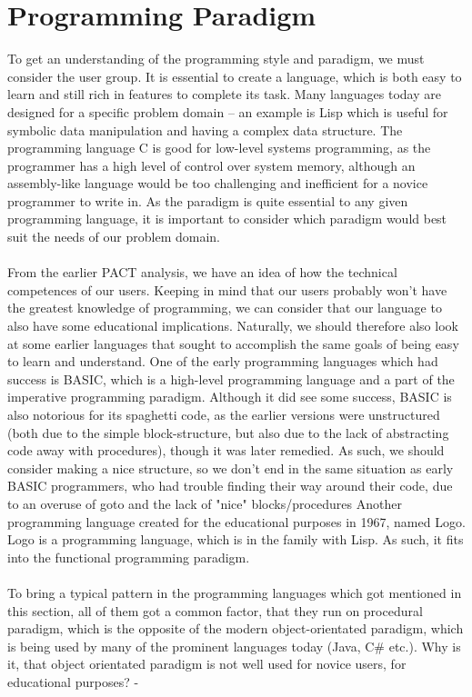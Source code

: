
\section{Programming Paradigm}
\label{programmingparadigm}
To get an understanding of the programming style and paradigm, we must consider the user group. It is essential to create a language, which is both easy to learn and still rich in features to complete its task. Many languages today are designed for a specific problem domain – an example is Lisp which is useful for symbolic data manipulation and having a complex data structure. The programming language C is good for low-level systems programming, as the programmer has a high level of control over system memory, although an assembly-like language would be too challenging and inefficient for a novice programmer to write in.
As the paradigm is quite essential to any given programming language, it is important to consider which paradigm would best suit the needs of our problem domain.\\
\\
From the earlier PACT analysis, we have an idea of how the technical competences of our users. Keeping in mind that our users probably won't have the greatest knowledge of programming, we can consider that our language to also have some educational implications. Naturally, we should therefore also look at some earlier languages that sought to accomplish the same goals of being easy to learn and understand.
One of the early programming languages which had success is BASIC, which is a high-level programming language and a part of the imperative programming paradigm. Although it did see some success, BASIC is also notorious for its spaghetti code, as the earlier versions were unstructured (both due to the simple block-structure, but also due to the lack of abstracting code away with procedures), though it was later remedied. As such, we should consider making a nice structure, so we don't end in the same situation as early BASIC programmers, who had trouble finding their way around their code, due to an overuse of goto and the lack of "nice" blocks/procedures
Another programming language created for the educational purposes in 1967, named Logo. Logo is a programming language, which is in the family with Lisp. As such, it fits into the functional programming paradigm. \cite{scott2000programming} \\
\\
To bring a typical pattern in the programming languages which got mentioned in this section, all of them got a common factor, that they run on procedural paradigm, which is the opposite of the modern object-orientated paradigm, which is being used by many of the prominent languages today (Java, C\# etc.). Why is it, that object orientated paradigm is not well used for novice users, for educational purposes? - 

